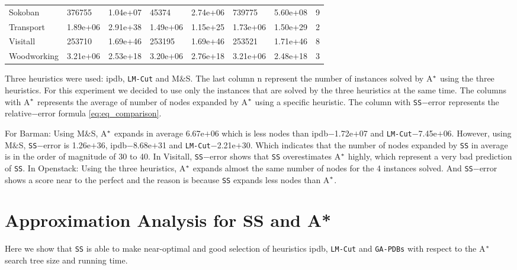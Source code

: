 \begin{table}[!htb]
\begin{tabular}{lR{2cm}R{2cm}R{2cm}R{2cm}R{2cm}R{2cm}C{2cm}}
Sokoban              & 376755      & 1.04e+07   & 45374             & 2.74e+06          & 739775       & 5.60e+08    & 9                  \\
Transport            & 1.89e+06    & 2.91e+38   & 1.49e+06          & 1.15e+25          & 1.73e+06     & 1.50e+29    & 2                  \\
Visitall             & 253710      & 1.69e+46   & 253195            & 1.69e+46          & 253521       & 1.71e+46    & 8                  \\
Woodworking          & 3.21e+06    & 2.53e+18   & 3.20e+06          & 2.76e+18          & 3.21e+06     & 2.48e+18    & 3                  \\ \hline
\end{tabular}
\end{table}

Three heuristics were used: ipdb, \texttt{LM-Cut} and M$\&$S.  The last column \textsf{n} represent the number of instances solved by A$\sp{*}$ using the three heuristics. For this experiment we decided to use only the instances that are solved by the three heuristics at the same time. The columns with A$\sp{*}$ represents the average of number of nodes expanded by A$\sp{*}$ using a specific heuristic. The column with \texttt{SS}$-$error represents the relative$-$error formula \ref{eq:eq_comparison}.

For Barman: Using M$\&$S, A$\sp{*}$ expands in average 6.67e$+$06 which is less nodes than ipdb$-$1.72e$+$07 and \texttt{LM-Cut}$-$7.45e$+$06. However, using M$\&$S, \texttt{SS}$-$error is 1.26e$+$36, ipdb$-$8.68e$+$31 and \texttt{LM-Cut}$-$2.21e$+$30. Which indicates that the number of nodes expanded by \texttt{SS} in average is in the order of magnitude of 30 to 40. In Visitall, \texttt{SS}$-$error shows that \texttt{SS} overestimates A$\sp{*}$ highly, which represent a very bad prediction of \texttt{SS}. In Openstack: Using the three heuristics, A$\sp{*}$ expands almost the same number of nodes for the 4 instances solved. And \texttt{SS}$-$error shows a score near to the perfect and the reason is because \texttt{SS} expands less nodes than A$\sp{*}$.\\

\section{Approximation Analysis for SS and A*}
\noindent
Here we show that \texttt{SS} is able to make near-optimal and good selection of heuristics ipdb, \texttt{LM-Cut} and \texttt{GA-PDBs} with respect to the A$\sp{*}$ search tree size and running time.

